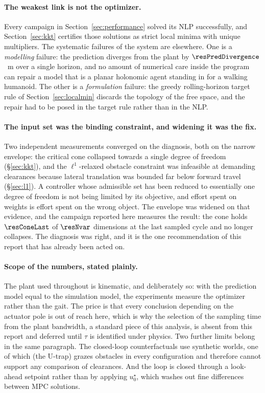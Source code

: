 \documentclass[11pt,a4paper]{article}
\begin{document}
\paragraph{The weakest link is not the optimizer.} Every campaign in Section~\ref{sec:performance} solved its
NLP successfully, and Section~\ref{sec:kkt} certifies those solutions as strict local minima with unique
multipliers. The systematic failures of the system are elsewhere. One is a \emph{modelling} failure: the
prediction diverges from the plant by $\resPredDivergence$~m over a single horizon, and no amount of
numerical care inside the program can repair a model that is a planar holonomic agent standing in for a
walking humanoid. The other is a \emph{formulation} failure: the greedy rolling-horizon target rule of
Section~\ref{sec:localmin} discards the topology of the free space, and the repair had to be posed in the
target rule rather than in the NLP.

\paragraph{The input set was the binding constraint, and widening it was the fix.} Two independent
measurements converged on the diagnosis, both on the narrow envelope: the critical cone collapsed towards a
single degree of freedom (\S\ref{sec:kkt}), and the $\ell^1$-relaxed obstacle constraint was infeasible at
demanding clearances because lateral translation was bounded far below forward travel (\S\ref{sec:l1}). A
controller whose admissible set has been reduced to essentially one degree of freedom is not being limited
by its objective, and effort spent on weights is effort spent on the wrong object. The envelope was widened
on that evidence, and the campaign reported here measures the result: the cone holds $\resConeLast$ of
$\resNvar$ dimensions at the last sampled cycle and no longer collapses. The diagnosis was right, and it is
the one recommendation of this report that has already been acted on.

\paragraph{Scope of the numbers, stated plainly.} The plant used throughout is kinematic, and deliberately
so: with the prediction model equal to the simulation model, the experiments measure the optimizer rather
than the gait. The price is that every conclusion depending on the actuator pole is out of reach here,
which is why the selection of the sampling time from the plant bandwidth, a standard piece of this analysis,
is absent from this report and deferred until $\tau$ is identified under physics. Two further limits belong
in the same paragraph. The closed-loop counterfactuals use synthetic worlds, one of which (the U-trap) grazes
obstacles in every configuration and therefore cannot support any comparison of clearances. And the loop is
closed through a look-ahead setpoint rather than by applying $u^\star_0$, which washes out fine differences
between MPC solutions.
\end{document}
